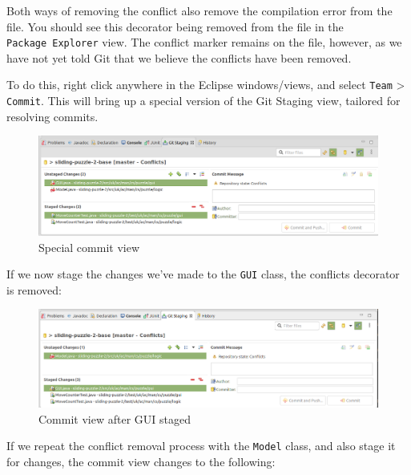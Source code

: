 \documentclass[
]{book}
\begin{document}
Both ways of removing the conflict also remove the compilation error from the file. You should see this decorator being removed from the file in the \texttt{Package\ Explorer} view. The conflict marker remains on the file, however, as we have not yet told Git that we believe the conflicts have been removed.

To do this, right click anywhere in the Eclipse windows/views, and select \texttt{Team} \textgreater{} \texttt{Commit}. This will bring up a special version of the Git Staging view, tailored for resolving commits.

\begin{figure}

{\centering \includegraphics[width=1\linewidth]{images/specialCommitView} 

}

\caption{Special commit view}\label{fig:specialCommitView-fig}
\end{figure}

If we now stage the changes we've made to the \texttt{GUI} class, the conflicts decorator is removed:

\begin{figure}

{\centering \includegraphics[width=1\linewidth]{images/commitViewAfterGuiStaged} 

}

\caption{Commit view after GUI staged}\label{fig:commitViewAfterGuiStaged-fig}
\end{figure}

If we repeat the conflict removal process with the \texttt{Model} class, and also stage it for changes, the commit view changes to the following:
\end{document}
